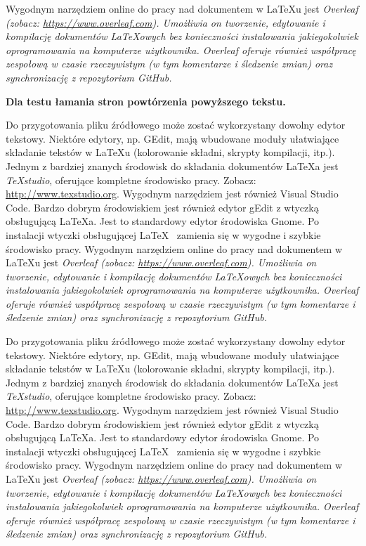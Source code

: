 Wygodnym narzędziem online do pracy nad dokumentem w \LaTeX u jest \em{Overleaf} (zobacz: \url{https://www.overleaf.com}). Umożliwia on tworzenie, edytowanie i kompilację dokumentów \LaTeX owych bez konieczności instalowania jakiegokolwiek oprogramowania na komputerze użytkownika. Overleaf oferuje również współpracę zespołową w czasie rzeczywistym (w tym komentarze i śledzenie zmian) oraz synchronizację z repozytorium GitHub.

\textbf{Dla testu łamania stron powtórzenia powyższego tekstu.}


Do przygotowania pliku źródłowego może zostać wykorzystany dowolny edytor tekstowy. Niektóre edytory, np. GEdit, mają wbudowane moduły ułatwiające składanie tekstów w \LaTeX u (kolorowanie składni, skrypty kompilacji, itp.).
Jednym z bardziej znanych środowisk do składania dokumentów  \LaTeX a jest {\em TeXstudio}, oferujące kompletne środowisko pracy. Zobacz: \url{http://www.texstudio.org}. Wygodnym narzędziem jest również Visual Studio Code.
Bardzo dobrym środowiskiem jest również edytor gEdit z wtyczką obsługującą \LaTeX a. Jest to standardowy edytor środowiska Gnome. Po instalacji wtyczki obsługującej \LaTeX~ zamienia się w wygodne i szybkie środowisko pracy.
Wygodnym narzędziem online do pracy nad dokumentem w \LaTeX u jest \em{Overleaf} (zobacz: \url{https://www.overleaf.com}). Umożliwia on tworzenie, edytowanie i kompilację dokumentów \LaTeX owych bez konieczności instalowania jakiegokolwiek oprogramowania na komputerze użytkownika. Overleaf oferuje również współpracę zespołową w czasie rzeczywistym (w tym komentarze i śledzenie zmian) oraz synchronizację z repozytorium GitHub.

Do przygotowania pliku źródłowego może zostać wykorzystany dowolny edytor tekstowy. Niektóre edytory, np. GEdit, mają wbudowane moduły ułatwiające składanie tekstów w \LaTeX u (kolorowanie składni, skrypty kompilacji, itp.).
Jednym z bardziej znanych środowisk do składania dokumentów  \LaTeX a jest {\em TeXstudio}, oferujące kompletne środowisko pracy. Zobacz: \url{http://www.texstudio.org}. Wygodnym narzędziem jest również Visual Studio Code.
Bardzo dobrym środowiskiem jest również edytor gEdit z wtyczką obsługującą \LaTeX a. Jest to standardowy edytor środowiska Gnome. Po instalacji wtyczki obsługującej \LaTeX~ zamienia się w wygodne i szybkie środowisko pracy.
Wygodnym narzędziem online do pracy nad dokumentem w \LaTeX u jest \em{Overleaf} (zobacz: \url{https://www.overleaf.com}). Umożliwia on tworzenie, edytowanie i kompilację dokumentów \LaTeX owych bez konieczności instalowania jakiegokolwiek oprogramowania na komputerze użytkownika. Overleaf oferuje również współpracę zespołową w czasie rzeczywistym (w tym komentarze i śledzenie zmian) oraz synchronizację z repozytorium GitHub.

